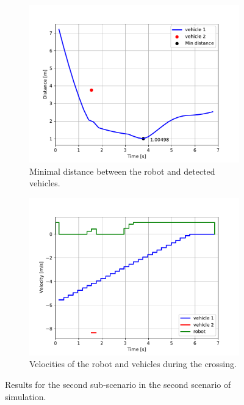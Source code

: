             \begin{figure}[H]
                \centering
                \begin{subfigure}{0.49\linewidth}
                    \centering
                    \includegraphics[trim={24 8 40 41}, clip, width=\linewidth]{images/simulations/scene2_2_dist.pdf}
                    \caption{Minimal distance between the robot and detected vehicles.}
                \end{subfigure}
                \begin{subfigure}{0.49\linewidth}
                    \centering
                    \includegraphics[trim={21 8 40 41}, clip, width=\linewidth]{images/simulations/scene2_2_vel.pdf}
                    \caption{Velocities of the robot and vehicles during the crossing.}
                \end{subfigure}
                \caption{Results for the second sub-scenario in the second scenario of simulation.}
                \label{fig:scene2_2_graphs}
            \end{figure}
